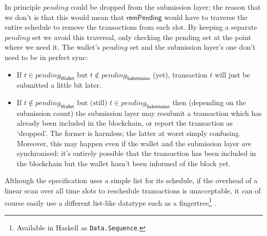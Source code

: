 \documentclass{article}
\numberwithin{equation}{lemma}
\begin{document}
In principle $\mathit{pending}$ could be dropped from the submission layer; the
reason that we don't is that this would mean that $\mathsf{remPending}$ would
have to traverse the entire schedule to remove the transactions from each slot.
By keeping a separate $\mathit{pending}$ set we avoid this traversal, only
checking the pending set at the point where we need it. The wallet's
$\mathit{pending}$ set and the submission layer's one don't need to be in
perfect sync:
%
\begin{itemize}
\item If
\begin{math}
t \in    \mathit{pending}_\mathsf{Wallet} \text{ but }
t \notin \mathit{pending}_\mathsf{Submission}
\end{math}
(yet), transaction $t$ will just be submitted a little bit later.

\item If
\begin{math}
t \notin \mathit{pending}_\mathsf{Wallet} \text{ but (still) }
t \in    \mathit{pending}_\mathsf{Submission}
\end{math}
then (depending on the submission count) the submission layer may resubmit a
transaction which has already been included in the blockchain, or report the
transaction as `dropped'. The former is harmless; the latter at worst simply
confusing. Moreover,  this may happen even if the wallet and the submission
layer \emph{are} synchronised: it's entirely possible that the transaction has
been included in the blockchain but the wallet hasn't been informed of the block
yet.
\end{itemize}

Although the specification uses a simple list for its schedule, if the overhead
of a linear scan over all time slots to reschedule transactions is unacceptable,
it can of course easily use a different list-like datatype such as a
fingertree\footnote{Available in Haskell as \texttt{Data.Sequence}.}
\citep{hinze_paterson_2006}.
\end{document}
